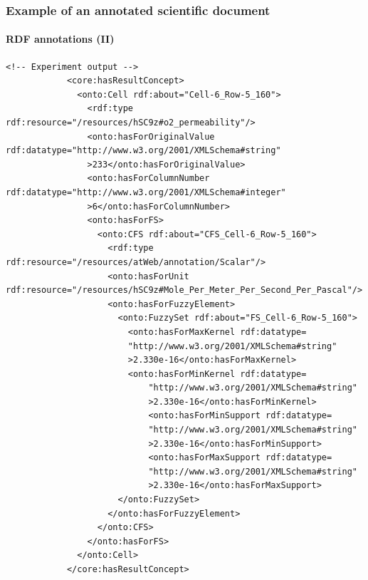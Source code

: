 \documentclass{beamer}
\begin{document}
\begin{frame}[fragile]
  \frametitle{Example of an annotated scientific document}
  \framesubtitle{RDF annotations (II)}

  \begin{Verbatim}[fontsize=\tiny]
            <!-- Experiment output -->
            <core:hasResultConcept>
              <onto:Cell rdf:about="Cell-6_Row-5_160">
                <rdf:type rdf:resource="/resources/hSC9z#o2_permeability"/>
                <onto:hasForOriginalValue rdf:datatype="http://www.w3.org/2001/XMLSchema#string"
                >233</onto:hasForOriginalValue>
                <onto:hasForColumnNumber rdf:datatype="http://www.w3.org/2001/XMLSchema#integer"
                >6</onto:hasForColumnNumber>
                <onto:hasForFS>
                  <onto:CFS rdf:about="CFS_Cell-6_Row-5_160">
                    <rdf:type rdf:resource="/resources/atWeb/annotation/Scalar"/>
                    <onto:hasForUnit rdf:resource="/resources/hSC9z#Mole_Per_Meter_Per_Second_Per_Pascal"/>
                    <onto:hasForFuzzyElement>
                      <onto:FuzzySet rdf:about="FS_Cell-6_Row-5_160">
                        <onto:hasForMaxKernel rdf:datatype=
                        "http://www.w3.org/2001/XMLSchema#string"
                        >2.330e-16</onto:hasForMaxKernel>
                        <onto:hasForMinKernel rdf:datatype=
                            "http://www.w3.org/2001/XMLSchema#string"
                            >2.330e-16</onto:hasForMinKernel>
                            <onto:hasForMinSupport rdf:datatype=
                            "http://www.w3.org/2001/XMLSchema#string"
                            >2.330e-16</onto:hasForMinSupport>
                            <onto:hasForMaxSupport rdf:datatype=
                            "http://www.w3.org/2001/XMLSchema#string"
                            >2.330e-16</onto:hasForMaxSupport>
                      </onto:FuzzySet>
                    </onto:hasForFuzzyElement>
                  </onto:CFS>
                </onto:hasForFS>
              </onto:Cell>
            </core:hasResultConcept>
  \end{Verbatim}
\end{frame}
\end{document}
